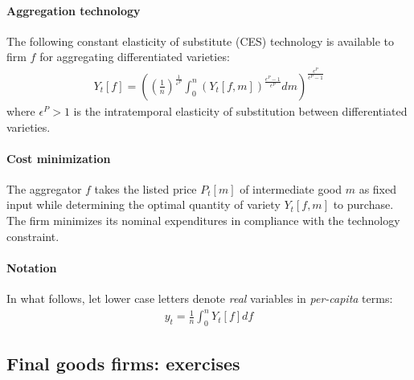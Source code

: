 \paragraph{Aggregation technology}
The following constant elasticity of substitute (CES) technology is available to firm \(f\) for aggregating differentiated varieties:
\begin{align}
Y_{t}[f] = {\left({\left(\frac{1}{n}\right)}^{\frac{1}{\varepsilon^{P}}} \int_{0}^{n} {(Y_{t}[f,m])}^{\frac{\epsilon^{P}-1}{\epsilon^{P}}} dm\right)}^{\frac{\epsilon^{P}}{\epsilon^{P}-1}} \label{eq:NewKeynesian.Firms.Aggregator}
\end{align}
where \(\epsilon^{P}>1\) is the intratemporal elasticity of substitution between differentiated varieties.

\paragraph{Cost minimization}
The aggregator \(f\) takes the listed price \(P_{t}[m]\) of intermediate good \(m\) as fixed input
  while determining the optimal quantity of variety \(Y_{t}[f,m]\) to purchase.
The firm minimizes its nominal expenditures in compliance with the technology constraint.

\paragraph{Notation}
In what follows, let lower case letters denote \emph{real} variables in \emph{per-capita} terms:
\begin{align*}
y_{t} = \frac{1}{n} \int_{0}^{n} Y_{t}[f] df
\end{align*}

\subsection{Final goods firms: exercises}

